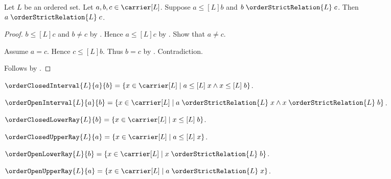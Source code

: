 \begin{proposition}\label{ordered_set_le_strict_transitive}
    Let $L$ be an ordered set.
    Let $a,b,c\in\carrier[L]$.
    Suppose $a\mathrel{\leq[L]}b$ and
        $b\mathrel{\orderStrictRelation{L}}c$.
    Then $a\mathrel{\orderStrictRelation{L}}c$.
\end{proposition}
\begin{proof}
    $b\mathrel{\leq[L]}c$ and $b\neq c$ by
        .
    Hence $a\mathrel{\leq[L]}c$ by
        .
    Show that $a\neq c$.
    \begin{subproof}
        Assume $a=c$.
        Hence $c\mathrel{\leq[L]}b$.
        Thus $b=c$ by
            .
        Contradiction.
    \end{subproof}
    Follows by .
\end{proof}

\begin{definition}\label{order_closed_interval}
    $\orderClosedInterval{L}{a}{b}
        =\{x\in\carrier[L]\mid
            a\mathrel{\leq[L]}x\land x\mathrel{\leq[L]}b\}$.
\end{definition}

\begin{definition}\label{order_open_interval}
    $\orderOpenInterval{L}{a}{b}
        =\{x\in\carrier[L]\mid
            a\mathrel{\orderStrictRelation{L}}x\land
            x\mathrel{\orderStrictRelation{L}}b\}$.
\end{definition}

\begin{definition}\label{order_closed_lower_ray}
    $\orderClosedLowerRay{L}{b}
        =\{x\in\carrier[L]\mid x\mathrel{\leq[L]}b\}$.
\end{definition}

\begin{definition}\label{order_closed_upper_ray}
    $\orderClosedUpperRay{L}{a}
        =\{x\in\carrier[L]\mid a\mathrel{\leq[L]}x\}$.
\end{definition}

\begin{definition}\label{order_open_lower_ray}
    $\orderOpenLowerRay{L}{b}
        =\{x\in\carrier[L]\mid
            x\mathrel{\orderStrictRelation{L}}b\}$.
\end{definition}

\begin{definition}\label{order_open_upper_ray}
    $\orderOpenUpperRay{L}{a}
        =\{x\in\carrier[L]\mid
            a\mathrel{\orderStrictRelation{L}}x\}$.
\end{definition}

